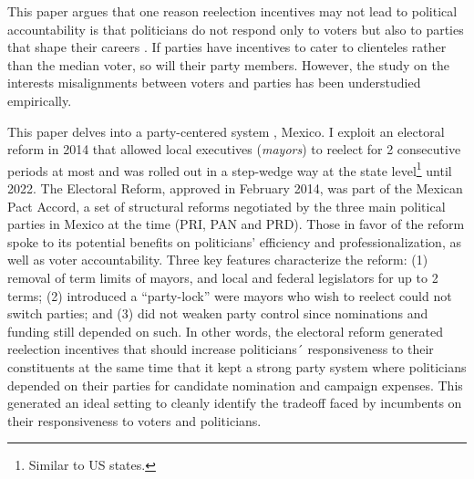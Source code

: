 \documentclass[12pt]{amsart}
\numberwithin{equation}{section}
\theoremstyle{definition}
\theoremstyle{definition}
\theoremstyle{definition}
\begin{document}
This paper argues that one reason reelection incentives may not lead to political accountability is that politicians do not respond only to voters but also to parties that shape their careers \citep{mayhew_1974,moreno_etal_2003,samuels_shugart_2010, klasnja_titiunik_2017}. If parties have incentives to cater to clienteles rather than the median voter, so will their party members. However, the study on the interests misalignments between voters and parties has been understudied empirically. %

This paper delves into a party-centered system%
, Mexico. I exploit an electoral reform in 2014 that allowed local executives (\emph{mayors}) to reelect for 2 consecutive periods at most and was rolled out in a step-wedge way at the state level\footnote{Similar to US states.} until 2022. The Electoral Reform, approved in February 2014, was part of the Mexican Pact Accord, a set of structural reforms negotiated by the three main political parties in Mexico at the time (PRI, PAN and PRD). Those in favor of the reform spoke to its potential benefits on politicians' efficiency and professionalization, as well as voter accountability. Three key features characterize the reform: (1) removal of term limits of mayors, and local and federal legislators for up to 2 terms; (2) introduced a ``party-lock'' were mayors who wish to reelect could not switch parties; and (3) did not weaken party control since nominations and funding still depended on such. In other words, the electoral reform generated reelection incentives that should increase politicians´ responsiveness to their constituents at the same time that it kept a strong party system where politicians depended on their parties for candidate nomination and campaign expenses. This generated an ideal setting to cleanly identify the tradeoff faced by incumbents on their responsiveness to voters and politicians. 
\end{document}
